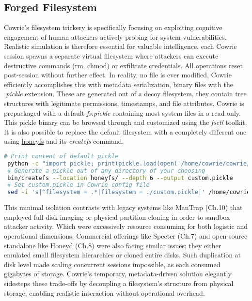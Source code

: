 \documentclass{cls/ULBreport}
\begin{document}
    \subsection{Forged Filesystem}
Cowrie's filesystem trickery is specifically focusing on exploiting cognitive engagement of human attackers actively probing for system vulnerabilities. Realistic simulation is therefore essential for valuable intelligence, each Cowrie session spawns a separate virtual filesystem where attackers can execute destructive commands (rm, chmod) or exfiltrate credentials. All operations reset post-session without further effect. In reality, no file is ever modified, Cowrie efficiently accomplishes this with metadata serialization, binary files with the \textit{.pickle} extension. These are generated out of a decoy filesystem, they contain tree structures with legitimate permissions, timestamps, and file attributes. Cowrie is prepackaged with a default \textit{fs.pickle} containing most system files in a read-only. This pickle binary can be browsed through and customized using the \textit{fsctl} toolkit. It is also possible to replace the default filesystem with a completely different one using \href{https://github.com/cowrie/cowrie/blob/main/docs/HONEYFS.rst}{honeyfs} and its \textit{createfs} command.
 \begin{lstlisting}[language=bash,caption={Deceptive Filesystem Manipulation}]
 # Print content of default pickle 
 python -c "import pickle; print(pickle.load(open('/home/cowrie/cowrie/data/fs.pickle','rb')))" 
 # Generate a pickle out of any directory of your choosing
 bin/createfs --location honeyfs/ --depth 6 --output custom.pickle  
 # Set custom.pickle in Cowrie config file 
 sed -i 's|^filesystem = .*|filesystem = ./custom.pickle|' /home/cowrie/cowrie/etc/cowrie.cfg
    \end{lstlisting}

This minimal isolation contrasts with legacy systems like ManTrap (Ch.10) that employed full disk imaging or physical partition cloning in order to sandbox attacker activity. Which were excessively resource consuming for both logistic and operational dimensions. Commercial offerings like Specter (Ch.7) and open-source standalone like Honeyd (Ch.8) were also facing similar issues; they either emulated small filesystem hierarchies or cloned entire disks. Such duplication at disk level made scaling concurrent sessions impossible, as each consumed gigabytes of storage. Cowrie's temporary, metadata-driven solution elegantly sidesteps these trade-offs by decoupling a filesystem's structure from physical storage, enabling realistic interaction without operational overhead.
\end{document}
